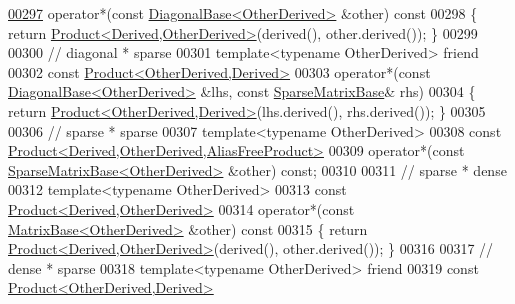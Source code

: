 \begin{DoxyCode}
\hyperlink{group___sparse_core___module_ad511aa3f5b977089238bf0903f8f2267}{00297}     operator*(\textcolor{keyword}{const} \hyperlink{class_eigen_1_1_diagonal_base}{DiagonalBase<OtherDerived>} &other)\textcolor{keyword}{ const}
00298 \textcolor{keyword}{    }\{ \textcolor{keywordflow}{return} \hyperlink{group___core___module_class_eigen_1_1_product}{Product<Derived,OtherDerived>}(derived(), other.derived()); \}
00299 
00300     \textcolor{comment}{// diagonal * sparse}
00301     \textcolor{keyword}{template}<\textcolor{keyword}{typename} OtherDerived> \textcolor{keyword}{friend}
00302     \textcolor{keyword}{const} \hyperlink{group___core___module_class_eigen_1_1_product}{Product<OtherDerived,Derived>}
00303     operator*(\textcolor{keyword}{const} \hyperlink{class_eigen_1_1_diagonal_base}{DiagonalBase<OtherDerived>} &lhs, \textcolor{keyword}{const} 
      \hyperlink{group___sparse_core___module_class_eigen_1_1_sparse_matrix_base}{SparseMatrixBase}& rhs)
00304     \{ \textcolor{keywordflow}{return} \hyperlink{group___core___module_class_eigen_1_1_product}{Product<OtherDerived,Derived>}(lhs.derived(), rhs.derived()); \}
00305     
00306     \textcolor{comment}{// sparse * sparse}
00307     \textcolor{keyword}{template}<\textcolor{keyword}{typename} OtherDerived>
00308     \textcolor{keyword}{const} \hyperlink{group___core___module_class_eigen_1_1_product}{Product<Derived,OtherDerived,AliasFreeProduct>}
00309     operator*(\textcolor{keyword}{const} \hyperlink{group___sparse_core___module_class_eigen_1_1_sparse_matrix_base}{SparseMatrixBase<OtherDerived>} &other) \textcolor{keyword}{const};
00310     
00311     \textcolor{comment}{// sparse * dense}
00312     \textcolor{keyword}{template}<\textcolor{keyword}{typename} OtherDerived>
00313     \textcolor{keyword}{const} \hyperlink{group___core___module_class_eigen_1_1_product}{Product<Derived,OtherDerived>}
00314     operator*(\textcolor{keyword}{const} \hyperlink{group___core___module_class_eigen_1_1_matrix_base}{MatrixBase<OtherDerived>} &other)\textcolor{keyword}{ const}
00315 \textcolor{keyword}{    }\{ \textcolor{keywordflow}{return} \hyperlink{group___core___module_class_eigen_1_1_product}{Product<Derived,OtherDerived>}(derived(), other.derived()); \}
00316     
00317     \textcolor{comment}{// dense * sparse}
00318     \textcolor{keyword}{template}<\textcolor{keyword}{typename} OtherDerived> \textcolor{keyword}{friend}
00319     \textcolor{keyword}{const} \hyperlink{group___core___module_class_eigen_1_1_product}{Product<OtherDerived,Derived>}

\end{DoxyCode}
